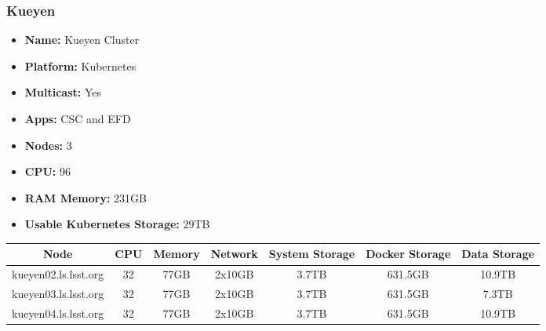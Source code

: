 \subsubsection{Kueyen}
\vspace*{0.1mm}
\begin{itemize}
  \itemsep0em 
  \item \textbf{Name:}       Kueyen Cluster
  \item \textbf{Platform:}   Kubernetes
  \item \textbf{Multicast:}  Yes
  \item \textbf{Apps:}       CSC and EFD
  \item \textbf{Nodes:}      3
  \item \textbf{CPU:}        96
  \item \textbf{RAM Memory:} 231GB
  \item \textbf{Usable Kubernetes Storage:} 29TB
\end{itemize}
\begin{center}
  \small
  \begin{tabular}{||c c c c c c c||}
    \hline
    \textbf{Node} & \textbf{CPU} & \textbf{Memory} & \textbf{Network} & \textbf{System Storage} & \textbf{Docker Storage} & \textbf{Data Storage} \\ [0.5ex]
    \hline
    kueyen02.ls.lsst.org & 32 & 77GB & 2x10GB & 3.7TB & 631.5GB & 10.9TB \\
    \hline
    kueyen03.ls.lsst.org & 32 & 77GB & 2x10GB & 3.7TB & 631.5GB & 7.3TB \\
    \hline
    kueyen04.ls.lsst.org & 32 & 77GB & 2x10GB & 3.7TB & 631.5GB & 10.9TB\\
    \hline
  \end{tabular}
\end{center}
\vspace*{0.1mm}
\newpage
